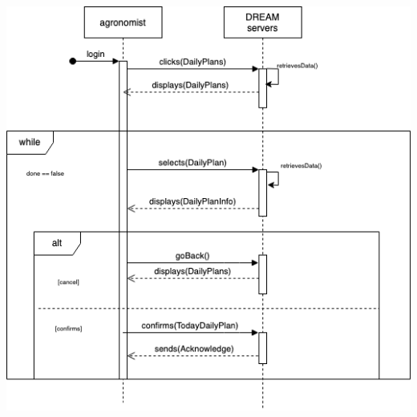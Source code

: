 \begin{center}
\includegraphics[scale=0.6]{Files/sequence_disgrams/thePNGs/agronomist_confirmPlan.png}\\
\end{center}

